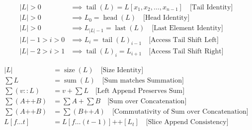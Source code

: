 \begin{equation*}
\begin{aligned}
|L| > 0 &\implies \operatorname{tail}(L)
  = L[x_1,x_2,\dots,x_{n-1}] \quad \text{[Tail Identity]} \\
|L| > 0 &\implies L_0 = \operatorname{head}(L)
  \quad \text{[Head Identity]} \\
|L| > 0 &\implies L_{|L|-1} = \operatorname{last}(L)
  \quad \text{[Last Element Identity]} \\
|L|-1 > i > 0 &\implies L_i = \operatorname{tail}(L)_{i-1}
  \quad \text{[Access Tail Shift Left]} \\
|L|-2 > i > 1 &\implies \operatorname{tail}(L)_i = L_{i+1}
  \quad \text{[Access Tail Shift Right]}
\end{aligned}
\end{equation*}

\begin{equation*}
\begin{aligned}
|L| &= \operatorname{size}(L) \quad \text{[Size Identity]} \\
\sum L &= \operatorname{sum}(L) \quad \text{[Sum matches Summation]} \\
\sum (v :: L) &= v + \sum L \quad \text{[Left Append Preserves Sum]} \\
\sum (A \mathbin{\texttt{++}} B) &= \sum A + \sum B
  \quad \text{[Sum over Concatenation]} \\
\sum (A \mathbin{\texttt{++}} B) &=
  \sum (B \mathbin{\texttt{++}} A)
  \quad \text{[Commutativity of Sum over Concatenation]} \\
L[f \dots t] &= L[f \dots (t-1)] \mathbin{\texttt{++}} [L_t]
  \quad \text{[Slice Append Consistency]}
\end{aligned}
\end{equation*}

